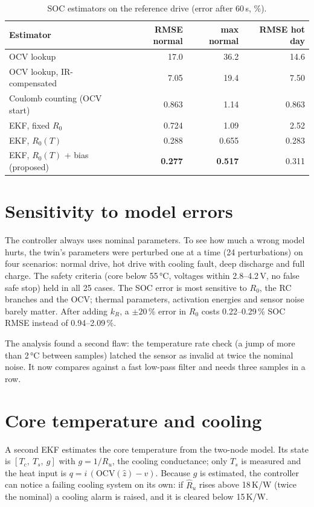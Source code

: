 \begin{table}[htbp]\centering\small
\caption{SOC estimators on the reference drive (error after 60\,s, \%).}\label{tab:est}
\begin{tabular}{@{}lrrr@{}}\toprule
Estimator & RMSE normal & max normal & RMSE hot day \\\midrule
OCV lookup & 17.0 & 36.2 & 14.6 \\
OCV lookup, IR-compensated & 7.05 & 19.4 & 7.50 \\
Coulomb counting (OCV start) & 0.863 & 1.14 & 0.863 \\
EKF, fixed $R_0$ & 0.724 & 1.09 & 2.52 \\
EKF, $R_0(T)$ & 0.288 & 0.655 & 0.283 \\
EKF, $R_0(T)$ + bias (proposed) & \textbf{0.277} & \textbf{0.517} & 0.311 \\\bottomrule
\end{tabular}
\end{table}


\section{Sensitivity to model errors}\label{sec:sens}
The controller always uses nominal parameters. To see how much a wrong model hurts, the twin's parameters were perturbed one at a time (24 perturbations) on four scenarios: normal drive, hot drive with cooling fault, deep discharge and full charge. The safety criteria (core below 55\,°C, voltages within 2.8--4.2\,V, no false safe stop) held in all 25 cases. The SOC error is most sensitive to $R_0$, the RC branches and the OCV; thermal parameters, activation energies and sensor noise barely matter. After adding $k_R$, a $\pm20$\,\% error in $R_0$ costs 0.22--0.29\,\% SOC RMSE instead of 0.94--2.09\,\%.

The analysis found a second flaw: the temperature rate check (a jump of more than 2\,°C between samples) latched the sensor as invalid at twice the nominal noise. It now compares against a fast low-pass filter and needs three samples in a row.


\section{Core temperature and cooling}\label{sec:thermal}
A second EKF estimates the core temperature from the two-node model. Its state is $[T_c,\ T_s,\ g]$ with $g = 1/R_u$, the cooling conductance; only $T_s$ is measured and the heat input is $q = i\,(\mathrm{OCV}(\hat z) - v)$. Because $g$ is estimated, the controller can notice a failing cooling system on its own: if $\hat R_u$ rises above 18\,K/W (twice the nominal) a cooling alarm is raised, and it is cleared below 15\,K/W.

